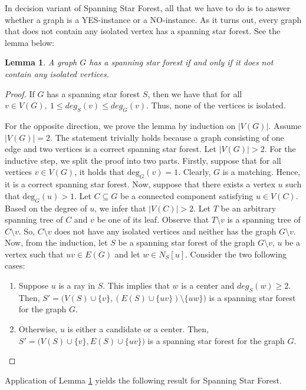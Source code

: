 \documentclass[en]{pracamgr}
\newtheorem{lemma}{Lemma}
\theoremstyle{definition}
\newcommand{\ssf}{spanning star forest}
\newcommand{\ssfp}{{\sc Spanning Star Forest}}
\newcommand{\degree}[2]{\textrm{deg}_{#1}(#2)}
\begin{document}
In decision variant of \ssfp{}, all that we have to do is to answer whether a graph is a YES-instance or a NO-instance. As it turns out, every graph that does not contain any isolated vertex has a \ssf{}. See the lemma below:

\begin{lemma}\label{SSF lemma}
 A graph $G$ has a \ssf{} if and only if it does not contain any isolated vertices.
\end{lemma}

\begin{proof}
	If $G$ has a \ssf{} $S$, then we have that for all $v \in V(G),\ 1 \leq deg_S(v) \leq deg_G(v)$. Thus, none of the vertices is isolated.
	
	For the opposite direction, we prove the lemma by induction on $|V(G)|$. Assume $|V(G)|=2$. The statement trivially holds because a graph consisting of one edge and two vertices is a correct \ssf{}. Let $|V(G)| >2$. For the inductive step, we split the proof into two parts. Firstly, suppose that for all vertices $v \in V(G)$, it holds that $\degree{G}{v}=1$.  Clearly, $G$ is a matching. Hence, it is a correct \ssf{}. Now, suppose that there exists a vertex $u$ such that $\degree{G}{u}>1$. Let $C \subseteq G$ be a connected component satisfying $u \in V(C)$. Based on the degree of $u$, we infer that $|V(C)|>2$. Let $T$ be an arbitrary spanning tree of $C$ and $v$ be one of its leaf. Observe that $T \setminus v$ is a spanning tree of $C \setminus v$. So, $C \setminus v$ does not have any isolated vertices and neither has the graph $G \setminus v$. Now, from the induction, let $S$ be a \ssf{} of the graph $G \setminus v$, $u$ be a vertex such that $uv \in E(G)$ and let $w \in N_S[u]$. Consider the two following cases:
	\begin{enumerate}
		\item Suppose $u$ is a ray in $S$. This implies that $w$ is a center and $deg_S(w) \geq 2$. Then, $S'=\big(V(S) \cup \{v\},(E(S) \cup \{uv\}) \setminus \{uw\}\big)$ is a spanning star forest for the graph $G$.
		\item Otherwise, $u$ is either a candidate or a center. Then, $S'=\big(V(S) \cup \{v\}, E(S) \cup \{uv\}\big)$ is a spanning star forest for the graph $G$.
	\end{enumerate}
	
\end{proof}

Application of Lemma \ref{SSF lemma} yields the following result for \ssfp{}.
\end{document}
